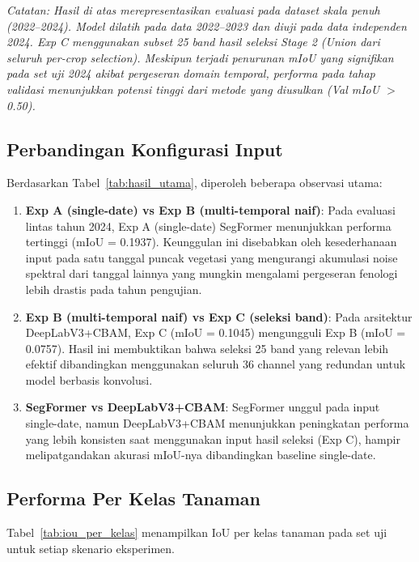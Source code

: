 \textit{Catatan: Hasil di atas merepresentasikan evaluasi pada dataset skala penuh (2022--2024). 
Model dilatih pada data 2022--2023 dan diuji pada data independen 2024. 
Exp C menggunakan subset 25 band hasil seleksi Stage 2 (Union dari seluruh per-crop selection). 
Meskipun terjadi penurunan mIoU yang signifikan pada set uji 2024 akibat pergeseran domain temporal, 
performa pada tahap validasi menunjukkan potensi tinggi dari metode yang diusulkan (Val mIoU $>$ 0.50).}

\subsection{Perbandingan Konfigurasi Input}

Berdasarkan Tabel~\ref{tab:hasil_utama}, diperoleh beberapa observasi utama:

\begin{enumerate}
    \item \textbf{Exp A (single-date) vs Exp B (multi-temporal naif)}: Pada evaluasi lintas tahun 2024,
    Exp A (single-date) SegFormer menunjukkan performa tertinggi (mIoU = 0.1937). Keunggulan ini 
    disebabkan oleh kesederhanaan input pada satu tanggal puncak vegetasi yang mengurangi 
    akumulasi noise spektral dari tanggal lainnya yang mungkin mengalami pergeseran fenologi 
    lebih drastis pada tahun pengujian.

    \item \textbf{Exp B (multi-temporal naif) vs Exp C (seleksi band)}: Pada arsitektur 
    DeepLabV3+CBAM, Exp C (mIoU = 0.1045) mengungguli Exp B (mIoU = 0.0757). Hasil ini 
    membuktikan bahwa seleksi 25 band yang relevan lebih efektif dibandingkan menggunakan 
    seluruh 36 channel yang redundan untuk model berbasis konvolusi.

    \item \textbf{SegFormer vs DeepLabV3+CBAM}: SegFormer unggul pada input single-date, 
    namun DeepLabV3+CBAM menunjukkan peningkatan performa yang lebih konsisten saat 
    menggunakan input hasil seleksi (Exp C), hampir melipatgandakan akurasi mIoU-nya 
    dibandingkan baseline single-date.
\end{enumerate}

\subsection{Performa Per Kelas Tanaman}

Tabel~\ref{tab:iou_per_kelas} menampilkan IoU per kelas tanaman pada set uji untuk setiap
skenario eksperimen.

